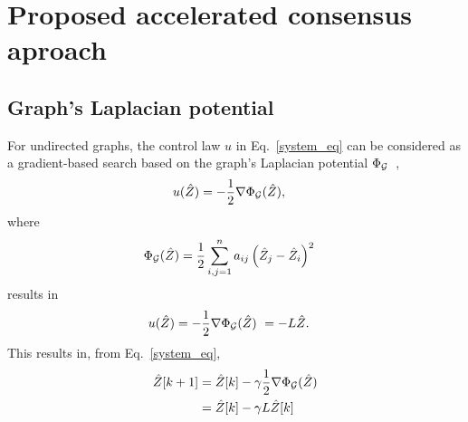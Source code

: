 \documentclass[conference]{IEEEtran}
\begin{document}
\vspace{0.1in}
\section{Proposed accelerated consensus aproach}

\vspace{0.1in}
\subsection{Graph's Laplacian potential}
For undirected graphs, the control law $u$ in  Eq.~\eqref{system_eq} can be considered as a  gradient-based search based on the 
graph's Laplacian potential $\Phi_{{\cal{G}}}$~\cite{OlfatiSaberIEEETAC_04}, 
\begin{align}
u(\hat{Z}) & = -{\frac{1}{2}}\nabla \Phi_{{\cal{G}}}(\hat{Z}), 
\label{Eq_u_gradient}
\end{align}
where~\cite{OlfatiSaberIEEETAC_04,Zhang_hui_IJC_2015}
\begin{align}
\Phi_{{\cal{G}}}(\hat{Z}) & =   \frac{1}{2} \sum_{i,j =1}^{n} a_{ij}\left( \hat{Z}_j - \hat{Z}_i \right)^2
\label{system_eq_potential}
\end{align}
results in 
\begin{align}
u(\hat{Z}) & = -{\frac{1}{2}}\nabla \Phi_{{\cal{G}}}(\hat{Z}) ~ = -L \hat{Z}. 
\label{Eq_u_gradient_2}
\end{align}
This results in,  from   Eq.~\eqref{system_eq}, 
\begin{align}
\hat{Z}[k+1] & =   \hat{Z}[k]   -  \gamma {\frac{1}{2}} \nabla \Phi_{{\cal{G}}}(\hat{Z}) \nonumber \\
& =   \hat{Z}[k] -  \gamma  L \hat{Z}[k] 
\label{system_gradient}
\end{align}

\vspace{0.1in}
\end{document}
